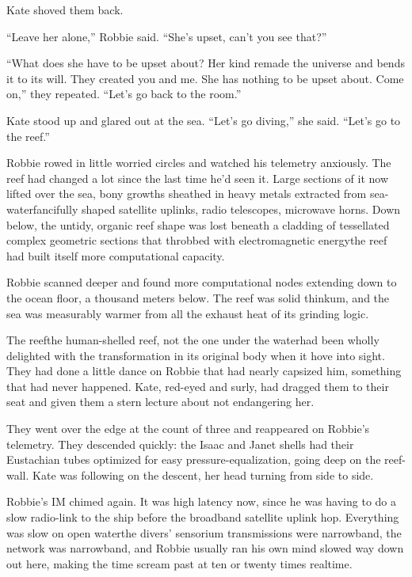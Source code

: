 Kate shoved them back.

“Leave her alone,” Robbie said. “She’s upset, can’t you see that?”

“What does she have to be upset about? Her kind remade the universe
and bends it to its will. They created you and me. She has nothing
to be upset about. Come on,” they repeated. “Let’s go back to the
room.”

Kate stood up and glared out at the sea. “Let’s go diving,” she
said. “Let’s go to the reef.”

\tb

Robbie rowed in little worried circles and watched his telemetry
anxiously. The reef had changed a lot since the last time he’d seen
it. Large sections of it now lifted over the sea, bony growths
sheathed in heavy metals extracted from sea-water\dash{}fancifully shaped
satellite uplinks, radio telescopes, microwave horns. Down below,
the untidy, organic reef shape was lost beneath a cladding of
tessellated complex geometric sections that throbbed with
electromagnetic energy\dash{}the reef had built itself more computational
capacity.

Robbie scanned deeper and found more computational nodes extending
down to the ocean floor, a thousand meters below. The reef was
solid thinkum, and the sea was measurably warmer from all the
exhaust heat of its grinding logic.

The reef\dash{}the human-shelled reef, not the one under the water\dash{}had
been wholly delighted with the transformation in its original body
when it hove into sight. They had done a little dance on Robbie
that had nearly capsized him, something that had never happened.
Kate, red-eyed and surly, had dragged them to their seat and given
them a stern lecture about not endangering her.

They went over the edge at the count of three and reappeared on
Robbie’s telemetry. They descended quickly: the Isaac and Janet
shells had their Eustachian tubes optimized for easy
pressure-equalization, going deep on the reef-wall. Kate was
following on the descent, her head turning from side to side.

Robbie’s IM chimed again. It was high latency now, since he was
having to do a slow radio-link to the ship before the broadband
satellite uplink hop. Everything was slow on open water\dash{}the divers’
sensorium transmissions were narrowband, the network was
narrowband, and Robbie usually ran his own mind slowed way down out
here, making the time scream past at ten or twenty times realtime.

